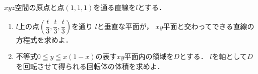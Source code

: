 \documentclass[../../main.tex]{subfiles}
\begin{document}
$xyz$空間の原点と点$(1,1,1)$を通る直線を$l$とする．
\begin{enumerate}
  \item $l$上の点$\displaystyle(\dfrac{t}{3},\dfrac{t}{3},\dfrac{t}{3})$を通り
    $l$と垂直な平面が，
    $xy$平面と交わってできる直線の方程式を求めよ．
  \item 不等式$0 \leqq y \leqq x(1-x)$の表す$xy$平面内の領域を$D$とする．
    $l$を軸として$D$を回転させて得られる回転体の体積を求めよ．
\end{enumerate}
\end{document}
